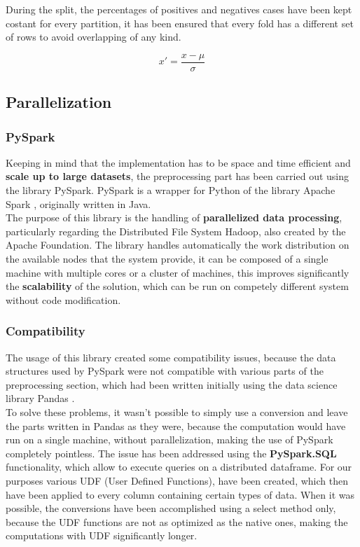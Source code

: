 \documentclass[
	letterpaper, %
	10pt, %
]{class}
\begin{document}
During the split, the percentages of positives and negatives cases have been kept costant for every partition, it has been ensured that every fold has a different set of rows to avoid overlapping of any kind.

$$ x' = \frac{x - \mu}{\sigma} $$

\subsection{Parallelization}

\subsubsection{PySpark}
Keeping in mind that the implementation has to be space and time efficient and \textbf{scale up to large datasets}, the preprocessing part has been carried out using the library PySpark.
PySpark is a wrapper for Python of the library Apache Spark \cite{spark}, originally written in Java.\\

The purpose of this library is the handling of \textbf{parallelized data processing}, particularly regarding the Distributed File System Hadoop, also created by the Apache Foundation.
The library handles automatically the work distribution on the available nodes that the system provide, it can be composed of a single machine with multiple cores or a cluster of machines, this improves significantly the \textbf{scalability} of the solution, which can be run on competely different system without code modification.\\

\subsubsection{Compatibility}

The usage of this library created some compatibility issues, because the data structures used by PySpark were not compatible with various parts of the preprocessing section, which had been written initially using the data science library Pandas \cite{pandas}.\\

To solve these problems, it wasn't possible to simply use a conversion and leave the parts written in Pandas as they were, because the computation would have run on a single machine, without parallelization, making the use of PySpark completely pointless.
The issue has been addressed using the \textbf{PySpark.SQL} functionality, which allow to execute queries on a distributed dataframe. For our purposes various UDF (User Defined Functions), have been created, which then have been applied to every column containing certain types of data.
When it was possible, the conversions have been accomplished using a select method only, because the UDF functions are not as optimized as the native ones, making the computations with UDF significantly longer.\\
\end{document}
